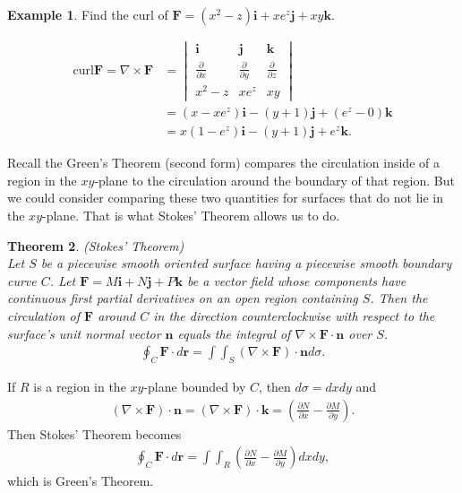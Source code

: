 \documentclass[12pt, letter]{article}
\theoremstyle{plain}
\newtheorem{theorem}{Theorem}
\numberwithin{theorem}{section}
\theoremstyle{definition}
\newtheorem{example}[theorem]{Example}
\begin{document}
\begin{example}
Find the curl of $\bm{F} = (x^2-z)\bm{i}+xe^z\bm{j}+xy\bm{k}$.

\bigskip

\begin{align*}
\text{curl}\bm{F} = \nabla \times \bm{F} &= \begin{vmatrix} \bm{i} & \bm{j} & \bm{k} \\ \frac{\partial}{\partial x} & \frac{\partial}{\partial y} & \frac{\partial}{\partial z} \\ x^2-z & xe^z & xy \end{vmatrix}\\
&= (x-xe^z)\bm{i}-(y+1)\bm{j}+(e^z-0)\bm{k}\\
&= x(1-e^z)\bm{i}-(y+1)\bm{j}+e^z\bm{k}.
\end{align*}
\end{example}

\bigskip

\hrulefill

\bigskip

Recall the Green's Theorem (second form) compares the circulation inside of a region in the $xy$-plane to the circulation around the boundary of that region. But we could consider comparing these two quantities for surfaces that do not lie in the $xy$-plane. That is what Stokes' Theorem allows us to do.

\bigskip

\begin{theorem}{(Stokes' Theorem)}
\\
Let $S$ be a piecewise smooth oriented surface having a piecewise smooth boundary curve $C$. Let $\bm{F} = M\bm{i}+N\bm{j}+P\bm{k}$ be a vector field whose components have continuous first partial derivatives on an open region containing $S$. Then the circulation of $\bm{F}$ around $C$ in the direction counterclockwise with respect to the surface's unit normal vector $\bm{n}$ equals the integral of $\nabla \times \bm{F} \cdot \bm{n}$ over $S$.
\begin{align*}
\oint_C \bm{F}\cdot d\bm{r} = \int\int_S (\nabla \times \bm{F})\cdot\bm{n} d\sigma.
\end{align*}
\end{theorem}

\bigskip

\hrulefill

\bigskip

If $R$ is a region in the $xy$-plane bounded by $C$, then $d\sigma = dxdy$ and
\begin{align*}
(\nabla \times \bm{F})\cdot\bm{n} = (\nabla \times \bm{F})\cdot\bm{k} = \left(\frac{\partial N}{\partial x} - \frac{\partial M}{\partial y}\right).
\end{align*}
Then Stokes' Theorem becomes
\begin{align*}
\oint_C \bm{F}\cdot d\bm{r} = \int\int_R \left(\frac{\partial N}{\partial x} - \frac{\partial M}{\partial y}\right) dxdy,
\end{align*}
which is Green's Theorem.
\end{document}
